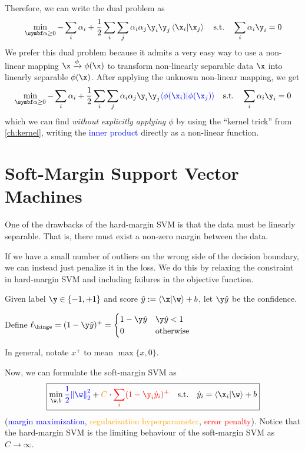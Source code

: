 \documentclass[class=cs480,notes,tikz]{agony}
\begin{document}
Therefore, we can write the dual problem as
\[ \min_{\symbf\alpha\geq0} {-\sum_i \alpha_i} + \frac12 \sum_i\sum_j \alpha_i\alpha_j\y_i\y_j\ip{\x_i}{\x_j} \qq{s.t.} \sum_i \alpha_i\y_i = 0 \]
We prefer this dual problem because it admits a very easy way to
use a non-linear mapping $\x \xto{\phi} \phi(\x)$
to transform non-linearly separable data $\x$
into linearly separable $\phi(\x)$.
After applying the unknown non-linear mapping, we get
\[ \min_{\symbf\alpha\geq0} {-\sum_i \alpha_i} + \frac12 \sum_i\sum_j \alpha_i\alpha_j\y_i\y_j\textcolor{blue}{\ip{\phi(\x_i)}{\phi(\x_j)}} \qq{s.t.} \sum_i \alpha_i\y_i = 0 \]
which we can find \emph{without explicitly applying $\phi$}
by using the ``kernel trick'' from \cref{ch:kernel},
writing the \textcolor{blue}{inner product} directly as a non-linear function.

\section{Soft-Margin Support Vector Machines}\label{ch:ssvm}

One of the drawbacks of the hard-margin SVM is that the data must be linearly separable.
That is, there must exist a non-zero margin between the data.

If we have a small number of outliers on the wrong side of the decision boundary,
we can instead just penalize it in the loss.
We do this by relaxing the constraint in hard-margin SVM
and including failures in the objective function.

\begin{defn}
  Given label $\y \in \{-1,+1\}$ and score $\hat y := \ip{\x}{\w}+b$,
  let $\y\hat y$ be the confidence.

  Define $\ell_{\hinge} = (1-\y\hat y)^+ = \begin{cases}
      1-\y\hat y & \y\hat y < 1     \\
      0          & \text{otherwise}
    \end{cases}$
\end{defn}

In general, notate $x^+$ to mean $\max\{x,0\}$.

Now, we can formulate the soft-margin SVM as
\begin{equation}\label{eq:ssvm}
  \boxed{
    \min_{\w,b} \textcolor{blue}{\frac12\norm{\w}^2_2}
    + \textcolor{orange}{C} \cdot \textcolor{red}{\sum_i(1-\y_i\hat y_i)^+}
    \qq{s.t.} \hat y_i = \ip{\x_i}{\w}+b
  }
\end{equation}
(\textcolor{blue}{margin maximization}, \textcolor{orange}{regularization hyperparameter}, \textcolor{red}{error penalty}).
Notice that the hard-margin SVM is the limiting behaviour
of the soft-margin SVM as $C \to \infty$.
\end{document}
